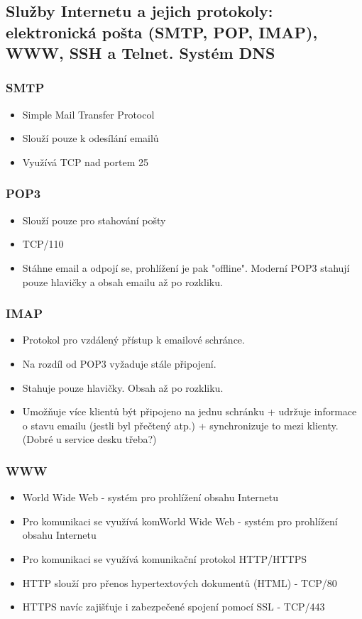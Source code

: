\documentclass[10pt,a4paper]{article}
\begin{document}
\subsection{Služby Internetu a jejich protokoly: elektronická pošta (SMTP, POP, IMAP), WWW, SSH a Telnet. Systém DNS}
\subsubsection{SMTP}
\begin{itemize}
\item Simple Mail Transfer Protocol
\item Slouží pouze k odesílání emailů
\item Využívá TCP nad portem 25
\end{itemize}

\subsubsection{POP3}

\begin{itemize}
\item Slouží pouze pro stahování pošty
\item TCP/110
\item Stáhne email a odpojí se, prohlížení je pak "offline". Moderní POP3 stahují pouze hlavičky a obsah emailu až po rozkliku.
\end{itemize}
\subsubsection{IMAP}

\begin{itemize}
\item Protokol pro vzdálený přístup k emailové schránce.
\item Na rozdíl od POP3 vyžaduje stále připojení.
\item Stahuje pouze hlavičky. Obsah až po rozkliku.
\item Umožňuje více klientů být připojeno na jednu schránku + udržuje informace o stavu emailu (jestli byl přečtený atp.) + synchronizuje to mezi klienty. (Dobré u service desku třeba?)
\end{itemize}
\subsubsection{WWW}

\begin{itemize}
\item World Wide Web - systém pro prohlížení obsahu Internetu
\item Pro komunikaci se využívá komWorld Wide Web - systém pro prohlížení obsahu Internetu
\item Pro komunikaci se využívá komunikační protokol HTTP/HTTPS
\item HTTP slouží pro přenos hypertextových dokumentů (HTML) - TCP/80
\item HTTPS navíc zajišťuje i zabezpečené spojení pomocí SSL - TCP/443
\end{itemize}
\end{document}
